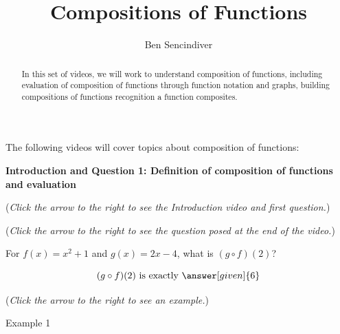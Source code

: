 \documentclass{ximera}
\title[Prerequisite Videos: ]{Compositions of Functions}
\author{Ben Sencindiver}
\begin{document}
\begin{abstract}
  In this set of videos, we will work to understand
  composition of functions, including evaluation 
  of composition of functions through function 
  notation and graphs, building compositions of functions
  recognition a function composites.
\end{abstract}
\maketitle

The following videos will cover topics about composition of functions:

\textbf{Introduction and Question 1: Definition 
  of composition of functions and  evaluation}
\begin{question}
\begin{flushright}
{\color{blue}(\emph{Click the arrow to the right to see the Introduction video and first question.})}
\end{flushright}
\begin{center}
\begin{expandable}
{\color{blue}(\emph{Click the arrow to the right to see the question
posed at the end of the video.})}
\begin{expandable}
For $f(x) = x^2 + 1$ and $g(x) =2x-4$, what is $(g \circ f)(2)$?\\
\begin{prompt}
\[
(g\circ f)(2) \text{ is exactly }\answer[given]{6}
\]
\end{prompt}
\begin{flushright}
{\color{blue}(\emph{Click the arrow to the right to see an example.})}
\end{flushright}
\begin{expandable}
Example 1
\end{expandable}
\end{expandable}
\end{expandable}
\end{center}
\end{question}
\end{document}

